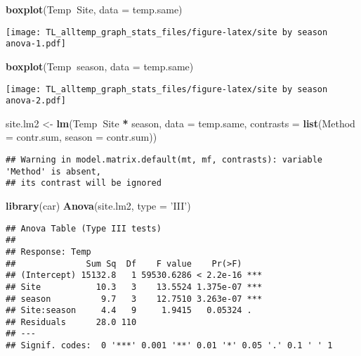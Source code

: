 \documentclass[
]{article}
\newenvironment{Shaded}{\begin{snugshade}}{\end{snugshade}}
\newcommand{\DataTypeTok}[1]{\textcolor[rgb]{0.13,0.29,0.53}{#1}}
\newcommand{\KeywordTok}[1]{\textcolor[rgb]{0.13,0.29,0.53}{\textbf{#1}}}
\newcommand{\NormalTok}[1]{#1}
\newcommand{\OperatorTok}[1]{\textcolor[rgb]{0.81,0.36,0.00}{\textbf{#1}}}
\newcommand{\StringTok}[1]{\textcolor[rgb]{0.31,0.60,0.02}{#1}}
\begin{document}
\begin{Shaded}
\begin{Highlighting}[]
\KeywordTok{boxplot}\NormalTok{(Temp}\OperatorTok{~}\NormalTok{Site, }\DataTypeTok{data =}\NormalTok{ temp.same)}
\end{Highlighting}
\end{Shaded}

\texttt{[image: TL\_alltemp\_graph\_stats\_files/figure-latex/site by season anova-1.pdf]}

\begin{Shaded}
\begin{Highlighting}[]
\KeywordTok{boxplot}\NormalTok{(Temp}\OperatorTok{~}\NormalTok{season, }\DataTypeTok{data =}\NormalTok{ temp.same)}
\end{Highlighting}
\end{Shaded}

\texttt{[image: TL\_alltemp\_graph\_stats\_files/figure-latex/site by season anova-2.pdf]}

\begin{Shaded}
\begin{Highlighting}[]
\NormalTok{site.lm2 <-}\StringTok{ }\KeywordTok{lm}\NormalTok{(Temp}\OperatorTok{~}\NormalTok{Site }\OperatorTok{*}\StringTok{ }\NormalTok{season, }\DataTypeTok{data =}\NormalTok{ temp.same, }\DataTypeTok{contrasts =} \KeywordTok{list}\NormalTok{(}\DataTypeTok{Method =}\NormalTok{ contr.sum, }\DataTypeTok{season =}\NormalTok{ contr.sum))}
\end{Highlighting}
\end{Shaded}

\begin{verbatim}
## Warning in model.matrix.default(mt, mf, contrasts): variable 'Method' is absent,
## its contrast will be ignored
\end{verbatim}

\begin{Shaded}
\begin{Highlighting}[]
\KeywordTok{library}\NormalTok{(car)}
\KeywordTok{Anova}\NormalTok{(site.lm2, }\DataTypeTok{type =} \StringTok{'III'}\NormalTok{)}
\end{Highlighting}
\end{Shaded}

\begin{verbatim}
## Anova Table (Type III tests)
## 
## Response: Temp
##              Sum Sq  Df    F value    Pr(>F)    
## (Intercept) 15132.8   1 59530.6286 < 2.2e-16 ***
## Site           10.3   3    13.5524 1.375e-07 ***
## season          9.7   3    12.7510 3.263e-07 ***
## Site:season     4.4   9     1.9415   0.05324 .  
## Residuals      28.0 110                         
## ---
## Signif. codes:  0 '***' 0.001 '**' 0.01 '*' 0.05 '.' 0.1 ' ' 1
\end{verbatim}
\end{document}
